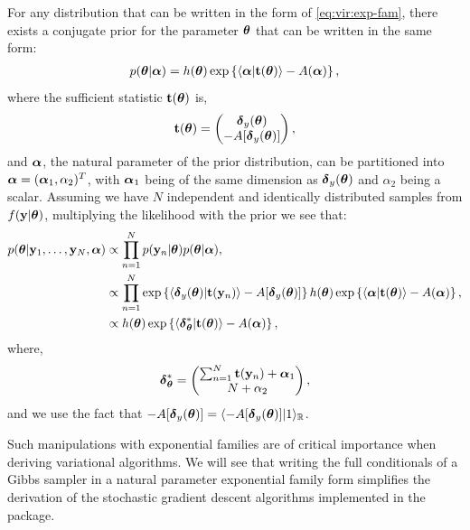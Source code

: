 \documentclass[]{article}
\newcommand{\Real}{\mathbb{R}}
\newcommand{\V}[1]{{\bm{\mathbf{\MakeLowercase{#1}}}}} %
\def\t{{\bf t}}
\def\y{{\bf y}}
\def \valpha{{\V{\alpha}}}
\def \vdelta{{\V{\delta}}}
\def \vtheta{{\V{\theta}}}
\begin{document}
For any distribution that can be written in the form of \eqref{eq:vir:exp-fam},
there exists a conjugate prior for the parameter $\vtheta$ that can be written
in the same form: 
\begin{align*}
	p(\vtheta | \valpha) = h(\vtheta) \exp \left\{ 
		\langle \valpha | \t(\vtheta) \rangle - 
		A(\valpha)	\right\},
\end{align*}
where the sufficient statistic $\t(\vtheta)$ is, 
\begin{align*}
	\t(\vtheta) = 
	\begin{pmatrix}
		\vdelta_{y}(\vtheta) \\
		-A[\vdelta_y(\vtheta)]
	\end{pmatrix},
\end{align*} 
and $\valpha$, the natural parameter of the prior distribution, can be
partitioned into $\valpha = (\valpha_1, \alpha_2)^T$, with $\valpha_1$ being of
the same dimension as $\vdelta_{y}(\vtheta)$ and $\alpha_2$ being a scalar.
Assuming we have $N$ independent and identically distributed samples from $f(\y
| \vtheta)$, multiplying the likelihood with the prior we see that:
\begin{align*}
	p(\vtheta | \y_1, \dots, \y_N, \valpha) & \propto 
		\prod_{n = 1}^N p(\y_n | \vtheta) p(\vtheta | \valpha), \\
	& \propto \prod_{n = 1}^N \exp \left\{ 
		\langle \vdelta_y(\vtheta) | \t(\y_n) \rangle - A[\vdelta_y(\vtheta)]
	\right\}
	h(\vtheta) \exp \left\{ 
		\langle \valpha| \t(\vtheta) \rangle - 
		A(\valpha)
	\right\}, \\
	& \propto h(\vtheta) \exp \left \{
		\langle \vdelta_{\vtheta}^* | \t(\vtheta) \rangle
		- A(\valpha)
	\right \},
\end{align*}
where, 
\begin{align}
\vdelta^*_{\vtheta} = 
	\begin{pmatrix}
		\sum_{n = 1}^N \t(\y_n) + \valpha_1 \\
		N + \alpha_2
	\end{pmatrix},
\end{align} 
and we use the fact that $-A[\vdelta_y(\vtheta)] = \langle
-A[\vdelta_y(\vtheta)] | 1 \rangle_{\Real}$.

Such manipulations with exponential families are of critical importance when
deriving variational algorithms. We will see that writing the full conditionals
of a Gibbs sampler in a natural parameter exponential family form simplifies the
derivation of the stochastic gradient descent algorithms implemented in the
package. 
\end{document}
